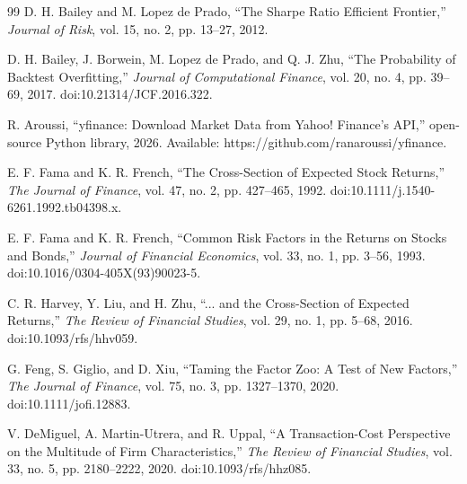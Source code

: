 \documentclass[10pt]{article}
\begin{document}
\begin{thebibliography}{99}
D. H. Bailey and M. Lopez de Prado, ``The Sharpe Ratio Efficient Frontier,'' \emph{Journal of Risk}, vol. 15, no. 2, pp. 13--27, 2012.

D. H. Bailey, J. Borwein, M. Lopez de Prado, and Q. J. Zhu, ``The Probability of Backtest Overfitting,'' \emph{Journal of Computational Finance}, vol. 20, no. 4, pp. 39--69, 2017. doi:10.21314/JCF.2016.322.

R. Aroussi, ``yfinance: Download Market Data from Yahoo! Finance's API,'' open-source Python library, 2026. Available: https://github.com/ranaroussi/yfinance.

E. F. Fama and K. R. French, ``The Cross-Section of Expected Stock Returns,'' \emph{The Journal of Finance}, vol. 47, no. 2, pp. 427--465, 1992. doi:10.1111/j.1540-6261.1992.tb04398.x.

E. F. Fama and K. R. French, ``Common Risk Factors in the Returns on Stocks and Bonds,'' \emph{Journal of Financial Economics}, vol. 33, no. 1, pp. 3--56, 1993. doi:10.1016/0304-405X(93)90023-5.

C. R. Harvey, Y. Liu, and H. Zhu, ``... and the Cross-Section of Expected Returns,'' \emph{The Review of Financial Studies}, vol. 29, no. 1, pp. 5--68, 2016. doi:10.1093/rfs/hhv059.

G. Feng, S. Giglio, and D. Xiu, ``Taming the Factor Zoo: A Test of New Factors,'' \emph{The Journal of Finance}, vol. 75, no. 3, pp. 1327--1370, 2020. doi:10.1111/jofi.12883.

V. DeMiguel, A. Martin-Utrera, and R. Uppal, ``A Transaction-Cost Perspective on the Multitude of Firm Characteristics,'' \emph{The Review of Financial Studies}, vol. 33, no. 5, pp. 2180--2222, 2020. doi:10.1093/rfs/hhz085.

\end{thebibliography}
\end{document}
